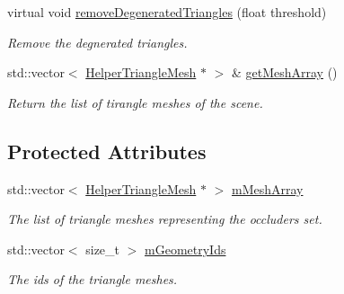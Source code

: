 \begin{DoxyCompactItemize}
\mbox{\label{classvisilib_1_1_helper_triangle_mesh_container_ac7b69c0fc33554617cda85f0f8a107f5}} 
virtual void \mbox{\hyperlink{classvisilib_1_1_helper_triangle_mesh_container_ac7b69c0fc33554617cda85f0f8a107f5}{remove\+Degenerated\+Triangles}} (float threshold)
\begin{DoxyCompactList}\small\item\em Remove the degnerated triangles. \end{DoxyCompactList}\item 
\mbox{\label{classvisilib_1_1_helper_triangle_mesh_container_a4c7a04386c117be925199448104a2b9f}} 
std\+::vector$<$ \mbox{\hyperlink{classvisilib_1_1_helper_triangle_mesh}{Helper\+Triangle\+Mesh}} $\ast$ $>$ \& \mbox{\hyperlink{classvisilib_1_1_helper_triangle_mesh_container_a4c7a04386c117be925199448104a2b9f}{get\+Mesh\+Array}} ()
\begin{DoxyCompactList}\small\item\em Return the list of tirangle meshes of the scene. \end{DoxyCompactList}\end{DoxyCompactItemize}
\subsection*{Protected Attributes}
\begin{DoxyCompactItemize}
\item 
\mbox{\label{classvisilib_1_1_helper_triangle_mesh_container_a5d498ba9b3fd39fd6c775a4fb192938d}} 
std\+::vector$<$ \mbox{\hyperlink{classvisilib_1_1_helper_triangle_mesh}{Helper\+Triangle\+Mesh}} $\ast$ $>$ \mbox{\hyperlink{classvisilib_1_1_helper_triangle_mesh_container_a5d498ba9b3fd39fd6c775a4fb192938d}{m\+Mesh\+Array}}
\begin{DoxyCompactList}\small\item\em The list of triangle meshes representing the occluders set. \end{DoxyCompactList}\item 
\mbox{\label{classvisilib_1_1_helper_triangle_mesh_container_af83c4c4673e39e3322af2d44c6728710}} 
std\+::vector$<$ size\+\_\+t $>$ \mbox{\hyperlink{classvisilib_1_1_helper_triangle_mesh_container_af83c4c4673e39e3322af2d44c6728710}{m\+Geometry\+Ids}}
\begin{DoxyCompactList}\small\item\em The ids of the triangle meshes. \end{DoxyCompactList}\end{DoxyCompactItemize}


